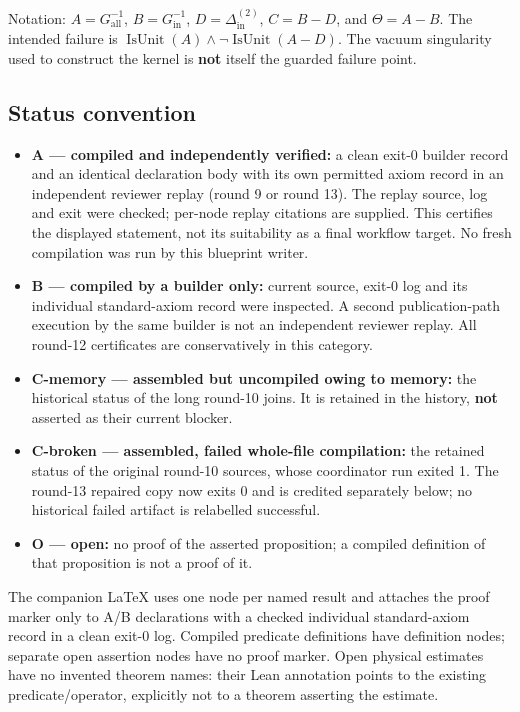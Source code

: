 Notation: \(A=G^{-1}_{\mathrm{all}}\), \(B=G^{-1}_{\mathrm{in}}\), \(D=\Delta^{(2)}_{\mathrm{in}}\), \(C=B-D\), and \(\Theta=A-B\). The intended failure is \(\operatorname{IsUnit}(A)\land\neg\operatorname{IsUnit}(A-D)\). The vacuum singularity used to construct the kernel is \textbf{not} itself the guarded failure point.

\subsection{Status convention}

\begin{itemize}
\item \textbf{A — compiled and independently verified:} a clean exit-0 builder record and an identical declaration body with its own permitted axiom record in an independent reviewer replay (round 9 or round 13). The replay source, log and exit were checked; per-node replay citations are supplied. This certifies the displayed statement, not its suitability as a final workflow target. No fresh compilation was run by this blueprint writer.
\item \textbf{B — compiled by a builder only:} current source, exit-0 log and its individual standard-axiom record were inspected. A second publication-path execution by the same builder is not an independent reviewer replay. All round-12 certificates are conservatively in this category.
\item \textbf{C-memory — assembled but uncompiled owing to memory:} the historical status of the long round-10 joins. It is retained in the history, \textbf{not} asserted as their current blocker.
\item \textbf{C-broken — assembled, failed whole-file compilation:} the retained status of the original round-10 sources, whose coordinator run exited 1. The round-13 repaired copy now exits 0 and is credited separately below; no historical failed artifact is relabelled successful.
\item \textbf{O — open:} no proof of the asserted proposition; a compiled definition of that proposition is not a proof of it.
\end{itemize}

The companion LaTeX uses one node per named result and attaches the proof marker only to A/B declarations with a checked individual standard-axiom record in a clean exit-0 log. Compiled predicate definitions have definition nodes; separate open assertion nodes have no proof marker. Open physical estimates have no invented theorem names: their Lean annotation points to the existing predicate/operator, explicitly not to a theorem asserting the estimate.

